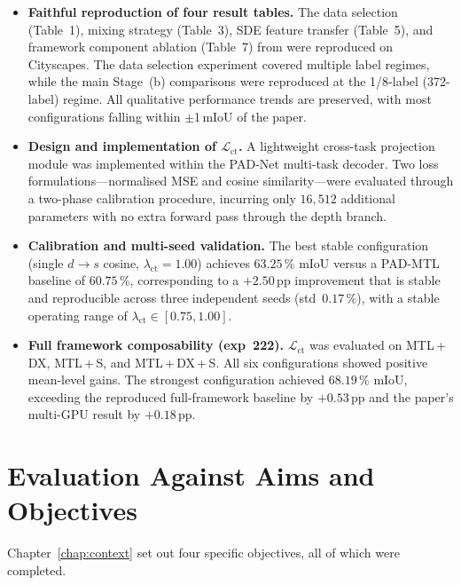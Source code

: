 \documentclass[
  oneside,
  author={Shijie Lu},
  degree={BSc},
  title={Label-Efficient Semantic Segmentation via Self-Supervised Depth Estimation and Cross-Task Consistency},
  unit={COMS30045},
  subtitle={}
]{dissertation}
\begin{document}
\begin{itemize}

\item \textbf{Faithful reproduction of four result tables.}
  The data selection (Table~1), mixing strategy (Table~3), SDE feature
  transfer (Table~5), and framework component ablation (Table~7) from
  \cite{hoyer2023improving} were reproduced on Cityscapes. The data
  selection experiment covered multiple label regimes, while the main
  Stage~(b) comparisons were reproduced at the 1/8-label (372-label)
  regime. All qualitative performance trends are preserved, with most
  configurations falling within $\pm$1\,mIoU of the paper.

\item \textbf{Design and implementation of $\mathcal{L}_\text{ct}$.}
  A lightweight cross-task projection module was implemented within the
  PAD-Net multi-task decoder. Two loss formulations---normalised MSE and
  cosine similarity---were evaluated through a two-phase calibration
  procedure, incurring only $16{,}512$ additional parameters with no
  extra forward pass through the depth branch.

\item \textbf{Calibration and multi-seed validation.}
  The best stable configuration (single $d{\rightarrow}s$ cosine,
  $\lambda_\text{ct}=1.00$) achieves $63.25$\,\% mIoU versus a PAD-MTL
  baseline of $60.75$\,\%, corresponding to a $+2.50$\,pp improvement
  that is stable and reproducible across three independent seeds
  (std~$0.17$\,\%), with a stable operating range of
  $\lambda_\text{ct} \in [0.75, 1.00]$.

\item \textbf{Full framework composability (exp~222).}
  $\mathcal{L}_\text{ct}$ was evaluated on MTL\,+\,DX, MTL\,+\,S, and
  MTL\,+\,DX\,+\,S. All six configurations showed positive mean-level
  gains. The strongest configuration achieved $68.19$\,\% mIoU,
  exceeding the reproduced full-framework baseline by $+0.53$\,pp and
  the paper's multi-GPU result by $+0.18$\,pp.

\end{itemize}

\section{Evaluation Against Aims and Objectives}

\noindent
Chapter~\ref{chap:context} set out four specific objectives, all of
which were completed.
\end{document}
